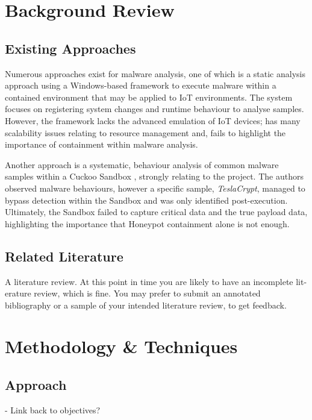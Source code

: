 \documentclass[a4paper,12pt,oneside]{book}			%
\begin{document}
\chapter{Background Review}\label{ch:backgroundReview}

\section{Existing Approaches}\label{sec:existingApproaches}

Numerous approaches exist for malware analysis, one of which is a static analysis approach using a Windows-based framework to execute malware \textit{\citep{static-analysis-drawbacks}} within a contained environment that may be applied to IoT environments. The system focuses on registering system changes and runtime behaviour to analyse samples. However, the framework lacks the advanced emulation of IoT devices; has many scalability issues relating to resource management and, fails to highlight the importance of containment within malware analysis.


Another approach is a systematic, behaviour analysis of common malware samples within a Cuckoo Sandbox \textit{\citep{analysis-mitigation-sandbox-evasion}}, strongly relating to the project. The authors observed malware behaviours, however a specific sample, \textit{TeslaCrypt}, managed to bypass detection within the Sandbox and was only identified post-execution. Ultimately, the Sandbox failed to capture critical data and the true payload data, highlighting the importance that Honeypot containment alone is not enough.


\section{Related Literature}\label{sec:relatedLiterature}

A literature review. At this point in time you are likely to have an incomplete lit-
erature review, which is fine. You may prefer to submit an annotated bibliography
or a sample of your intended literature review, to get feedback.


\chapter{Methodology \&{} Techniques}\label{ch:methods}
\section{Approach}\label{sec:approach}
- Link back to objectives?
\end{document}
